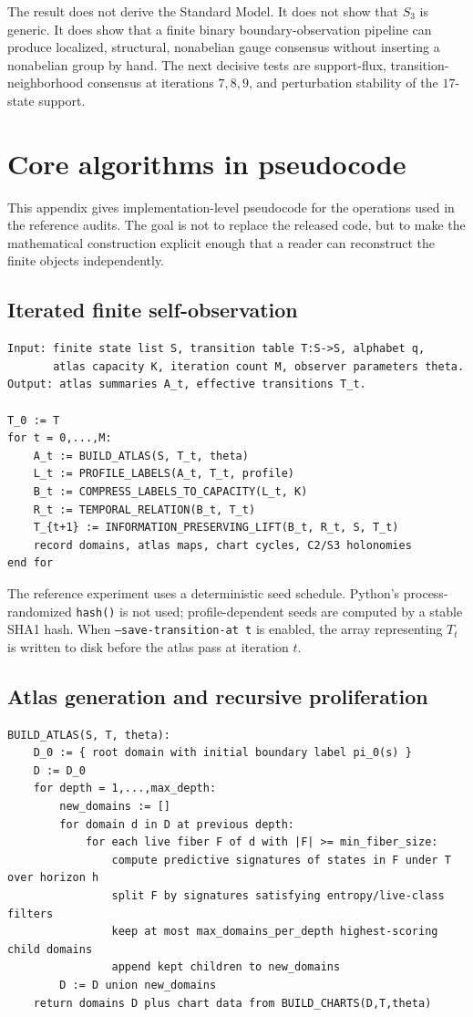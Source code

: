 \documentclass[11pt]{article}
\begin{document}
The result does not derive the Standard Model.  It does not show that $S_3$ is generic.  It does show that a finite binary boundary-observation pipeline can produce localized, structural, nonabelian gauge consensus without inserting a nonabelian group by hand.  The next decisive tests are support-flux, transition-neighborhood consensus at iterations $7,8,9$, and perturbation stability of the $17$-state support.


\appendix
\section{Core algorithms in pseudocode}\label{app:pseudocode}

This appendix gives implementation-level pseudocode for the operations used in the reference audits.  The goal is not to replace the released code, but to make the mathematical construction explicit enough that a reader can reconstruct the finite objects independently.

\subsection{Iterated finite self-observation}
\begin{lstlisting}
Input: finite state list S, transition table T:S->S, alphabet q,
       atlas capacity K, iteration count M, observer parameters theta.
Output: atlas summaries A_t, effective transitions T_t.

T_0 := T
for t = 0,...,M:
    A_t := BUILD_ATLAS(S, T_t, theta)
    L_t := PROFILE_LABELS(A_t, T_t, profile)
    B_t := COMPRESS_LABELS_TO_CAPACITY(L_t, K)
    R_t := TEMPORAL_RELATION(B_t, T_t)
    T_{t+1} := INFORMATION_PRESERVING_LIFT(B_t, R_t, S, T_t)
    record domains, atlas maps, chart cycles, C2/S3 holonomies
end for
\end{lstlisting}

The reference experiment uses a deterministic seed schedule.  Python's process-randomized \texttt{hash()} is not used; profile-dependent seeds are computed by a stable SHA1 hash.  When \texttt{--save-transition-at t} is enabled, the array representing $T_t$ is written to disk before the atlas pass at iteration $t$.

\subsection{Atlas generation and recursive proliferation}
\begin{lstlisting}
BUILD_ATLAS(S, T, theta):
    D_0 := { root domain with initial boundary label pi_0(s) }
    D := D_0
    for depth = 1,...,max_depth:
        new_domains := []
        for domain d in D at previous depth:
            for each live fiber F of d with |F| >= min_fiber_size:
                compute predictive signatures of states in F under T over horizon h
                split F by signatures satisfying entropy/live-class filters
                keep at most max_domains_per_depth highest-scoring child domains
                append kept children to new_domains
        D := D union new_domains
    return domains D plus chart data from BUILD_CHARTS(D,T,theta)
\end{lstlisting}
\end{document}
